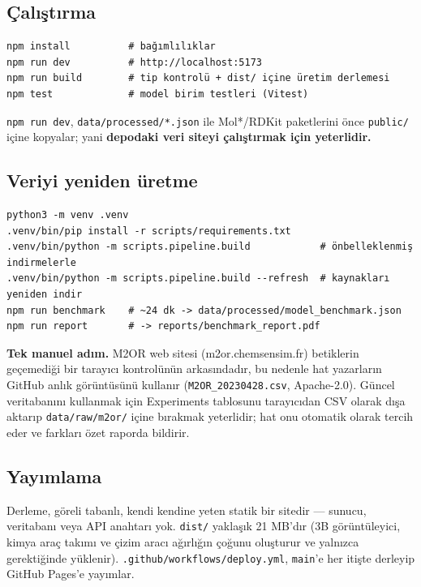 \documentclass[11pt,a4paper]{article}
\begin{document}
\subsection{Çalıştırma}


\begin{Verbatim}[fontsize=\small, xleftmargin=1em]
npm install          # bağımlılıklar
npm run dev          # http://localhost:5173
npm run build        # tip kontrolü + dist/ içine üretim derlemesi
npm test             # model birim testleri (Vitest)
\end{Verbatim}

\texttt{\small npm run dev}, \texttt{\small data/processed/*.json} ile Mol*/RDKit paketlerini önce \texttt{\small public/} içine kopyalar; yani \textbf{depodaki veri siteyi çalıştırmak için yeterlidir.}


\subsection{Veriyi yeniden üretme}


\begin{Verbatim}[fontsize=\small, xleftmargin=1em]
python3 -m venv .venv
.venv/bin/pip install -r scripts/requirements.txt
.venv/bin/python -m scripts.pipeline.build            # önbelleklenmiş indirmelerle
.venv/bin/python -m scripts.pipeline.build --refresh  # kaynakları yeniden indir
npm run benchmark    # ~24 dk -> data/processed/model_benchmark.json
npm run report       # -> reports/benchmark_report.pdf
\end{Verbatim}

\textbf{Tek manuel adım.} M2OR web sitesi (m2or.chemsensim.fr) betiklerin geçemediği bir tarayıcı kontrolünün arkasındadır, bu nedenle hat yazarların GitHub anlık görüntüsünü kullanır (\texttt{\small M2OR\_20230428.csv}, Apache-2.0). Güncel veritabanını kullanmak için Experiments tablosunu tarayıcıdan CSV olarak dışa aktarıp \texttt{\small data/raw/m2or/} içine bırakmak yeterlidir; hat onu otomatik olarak tercih eder ve farkları özet raporda bildirir.


\subsection{Yayımlama}

Derleme, göreli tabanlı, kendi kendine yeten statik bir sitedir — sunucu, veritabanı veya API anahtarı yok. \texttt{\small dist/} yaklaşık 21 MB'dır (3B görüntüleyici, kimya araç takımı ve çizim aracı ağırlığın çoğunu oluşturur ve yalnızca gerektiğinde yüklenir). \texttt{\small .github/workflows/deploy.yml}, \texttt{\small main}'e her itişte derleyip GitHub Pages'e yayımlar.
\end{document}
